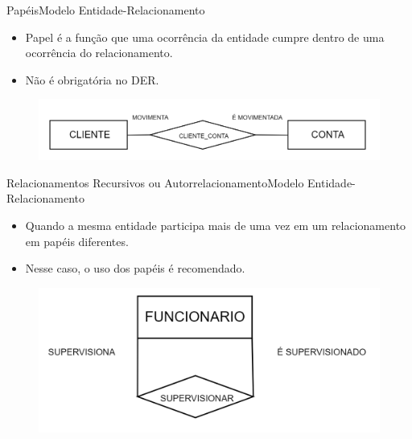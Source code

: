 \documentclass[t]{beamer}
\begin{document}

\begin{ftst}{Papéis}{Modelo Entidade-Relacionamento}
\begin{itemize}
    \item Papel é a função que uma ocorrência da entidade cumpre dentro de uma ocorrência do relacionamento.
    \item Não é obrigatória no DER.
\end{itemize}
\vone
\begin{figure}
    \centering
    \includegraphics[scale=0.2]{Figuras/01_11.png}
\end{figure}

\end{ftst}


\begin{ftst}{Relacionamentos Recursivos ou Autorrelacionamento}{Modelo Entidade-Relacionamento}
\begin{itemize}
    \item Quando a mesma entidade participa mais de uma vez em um relacionamento em papéis diferentes.
    \item Nesse caso, o uso dos papéis é recomendado.
\end{itemize}
\vone
\begin{figure}
    \centering
    \includegraphics[scale=0.25]{Figuras/01_12.png}
\end{figure}

\end{ftst}

\end{document}
